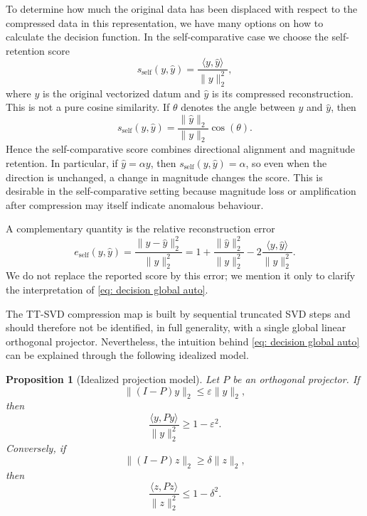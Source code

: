 \documentclass{article}
\newtheorem{proposition}{Proposition}[section]
\begin{document}
To determine how much the original data has been displaced with respect to the compressed data in this representation, we have many options on how to calculate the decision function. In the self-comparative case we choose the self-retention score
\begin{equation}\label{eq: decision global auto}
    s_{\mathrm{self}}(y,\hat y)=\frac{\langle y,\hat y\rangle}{\lVert y\rVert_2^2},
\end{equation}
where $y$ is the original vectorized datum and $\hat y$ is its compressed reconstruction. This is not a pure cosine similarity. If $\theta$ denotes the angle between $y$ and $\hat y$, then
\begin{equation}\label{eq:self-retention-factorization}
    s_{\mathrm{self}}(y,\hat y)=\frac{\lVert \hat y\rVert_2}{\lVert y\rVert_2}\cos(\theta).
\end{equation}
Hence the self-comparative score combines directional alignment and magnitude retention. In particular, if $\hat y=\alpha y$, then $s_{\mathrm{self}}(y,\hat y)=\alpha$, so even when the direction is unchanged, a change in magnitude changes the score. This is desirable in the self-comparative setting because magnitude loss or amplification after compression may itself indicate anomalous behaviour.

A complementary quantity is the relative reconstruction error
\begin{equation}\label{eq:self-relative-error}
    e_{\mathrm{self}}(y,\hat y)=\frac{\lVert y-\hat y\rVert_2^2}{\lVert y\rVert_2^2}
    =1+\frac{\lVert \hat y\rVert_2^2}{\lVert y\rVert_2^2}-2\frac{\langle y,\hat y\rangle}{\lVert y\rVert_2^2}.
\end{equation}
We do not replace the reported score by this error; we mention it only to clarify the interpretation of \eqref{eq: decision global auto}.

The TT-SVD compression map is built by sequential truncated SVD steps and should therefore not be identified, in full generality, with a single global linear orthogonal projector. Nevertheless, the intuition behind \eqref{eq: decision global auto} can be explained through the following idealized model.

\begin{proposition}[Idealized projection model]
Let $P$ be an orthogonal projector. If
\[
    \lVert (I-P)y\rVert_2 \leq \varepsilon \lVert y\rVert_2,
\]
then
\[
    \frac{\langle y,Py\rangle}{\lVert y\rVert_2^2}
    \geq 1-\varepsilon^2.
\]
Conversely, if
\[
    \lVert (I-P)z\rVert_2 \geq \delta \lVert z\rVert_2,
\]
then
\[
    \frac{\langle z,Pz\rangle}{\lVert z\rVert_2^2}
    \leq 1-\delta^2.
\]
\end{proposition}
\end{document}
